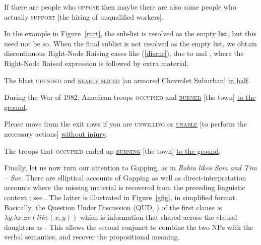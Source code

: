 {\begin{exe}
\begin{xlista}
\ex If there are people who \textsc{oppose} then maybe there are also some
  people who actually \textsc{support}  [the hiring of unqualified
  workers].\\
  \citep[]{chavesrnr}

\end{xlista}


\end{exe}




In the example in Figure~\ref{rnrt}, the sub-list  is resolved as the empty list, but this need not be so. When the final sublist is not resolved as the empty list, we obtain discontinuous Right-Node Raising cases like (\ref{disrnr}), due to  \citet[238--240]{Whitman:09}
and \citet[868]{chavesrnr}, where the Right-Node Raised expression is followed by extra material. 
\begin{exe}
\ex \begin{xlista}
\ex The blast \textsc{upended} and \underline{\textsc{nearly sliced}} [an armored Chevrolet Suburban] \underline{in half}.

\ex During the War of 1982, American troops
\textsc{occupied}  and \underline{\textsc{burned}} [the town] \underline{to the ground}.

\ex Please move from the exit rows if you are \textsc{unwilling} or \underline{\textsc{unable}}
 [to perform the necessary actions] \underline{without injury}.

\ex The troops that \textsc{occupied} ended up \underline{\textsc{burning}}
[the town] \underline{to the ground}.



\end{xlista}\label{disrnr}
\end{exe}



Finally, let us now turn our attention to Gapping, as in 
\emph{Robin likes Sam and Tim -- Sue}.
There are elliptical accounts of Gapping  \citep{chaves06} as well as direct-interpretation accounts where the missing material is recovered from the preceding linguistic context  \citep{Mouret:06,Abeille:Blbie:Mouret:14,sangheepark}; see . The latter is illustrated in Figure~\ref{gfig}, in simplified format. Basically, the Question Under Discussion (QUD, \citealp{roberts96}) of the first clause is $\lambda y.\lambda x. \exists e(like(x,y))$ which is information that shared across the clausal daughters as .
This allows the second conjunct to combine the two NPs with the verbal semantics, and recover the propositional meaning.

}
